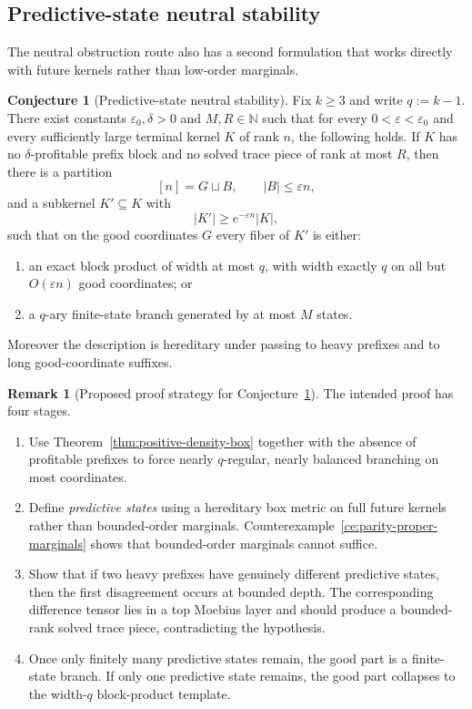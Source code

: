 \documentclass[11pt]{article}
\theoremstyle{definition}
\newtheorem{conjecture}[theorem]{Conjecture}
\newtheorem{remark}[theorem]{Remark}
\newcommand{\eps}{\varepsilon}
\newcommand{\N}{\mathbb{N}}
\newcommand{\1}{\mathbf{1}}
\begin{document}
\subsection*{Predictive-state neutral stability}
The neutral obstruction route also has a second formulation that works directly with future kernels rather than low-order marginals.

\begin{conjecture}[Predictive-state neutral stability]\label{conj:predictive-state}
Fix $k\ge 3$ and write $q:=k-1$. There exist constants $\eps_0,\delta>0$ and $M,R\in \N$ such that for every $0<\eps<\eps_0$ and every sufficiently large terminal kernel $K$ of rank $n$, the following holds. If $K$ has no $\delta$-profitable prefix block and no solved trace piece of rank at most $R$, then there is a partition
\[
[n]=G\sqcup B,
\qquad |B|\le \eps n,
\]
and a subkernel $K'\subseteq K$ with
\[
|K'|\ge e^{-\eps n}|K|,
\]
such that on the good coordinates $G$ every fiber of $K'$ is either:
\begin{enumerate}[label=(\roman*),leftmargin=2.2em]
\item an exact block product of width at most $q$, with width exactly $q$ on all but $O(\eps n)$ good coordinates; or
\item a $q$-ary finite-state branch generated by at most $M$ states.
\end{enumerate}
Moreover the description is hereditary under passing to heavy prefixes and to long good-coordinate suffixes.
\end{conjecture}

\begin{remark}[Proposed proof strategy for Conjecture~\ref{conj:predictive-state}]
The intended proof has four stages.
\begin{enumerate}[label=(\roman*),leftmargin=2.2em]
\item Use Theorem~\ref{thm:positive-density-box} together with the absence of profitable prefixes to force nearly $q$-regular, nearly balanced branching on most coordinates.
\item Define \emph{predictive states} using a hereditary box metric on full future kernels rather than bounded-order marginals. Counterexample~\ref{ce:parity-proper-marginals} shows that bounded-order marginals cannot suffice.
\item Show that if two heavy prefixes have genuinely different predictive states, then the first disagreement occurs at bounded depth. The corresponding difference tensor lies in a top Moebius layer and should produce a bounded-rank solved trace piece, contradicting the hypothesis.
\item Once only finitely many predictive states remain, the good part is a finite-state branch. If only one predictive state remains, the good part collapses to the width-$q$ block-product template.
\end{enumerate}
\end{remark}
\end{document}
